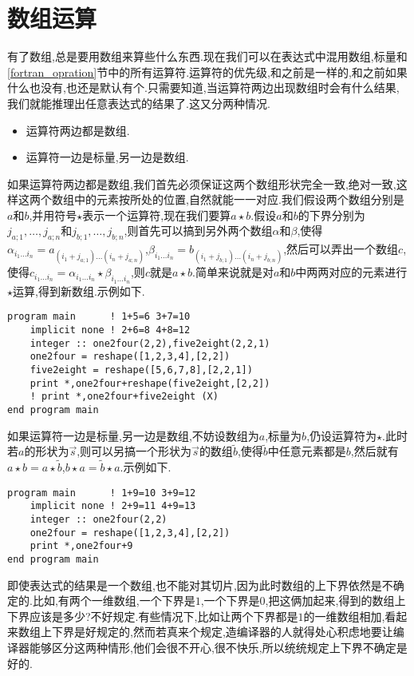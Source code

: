 \section{数组运算}

有了数组,总是要用数组来算些什么东西.现在我们可以在表达式中混用数组,标量和\ref{fortran_opration}节中的所有运算符.运算符的优先级,和之前是一样的,\ttt{+}和\ttt{-}之前如果什么也没有,也还是默认有个.只需要知道,当运算符两边出现数组时会有什么结果,我们就能推理出任意表达式的结果了.这又分两种情况.
\begin{itemize}
\item 运算符两边都是数组.
\item 运算符一边是标量,另一边是数组.
\end{itemize}

如果运算符两边都是数组,我们首先必须保证这两个数组形状完全一致,绝对一致,这样这两个数组中的元素按所处的位置,自然就能一一对应.我们假设两个数组分别是$a$和$b$,并用符号$\star$表示一个运算符,现在我们要算$a\star b$.假设$a$和$b$的下界分别为$j_{a;1},\dots,j_{a;n}$和$j_{b;1},\dots,j_{b;n}$,则首先可以搞到另外两个数组$\alpha$和$\beta$,使得$\alpha_{i_1\dots i_n}=a_{(i_1+j_{a;1})\dots(i_n+j_{a;n})}$,$\beta_{i_1\dots i_n}=b_{(i_1+j_{b;1})\dots(i_n+j_{b;n})}$,然后可以弄出一个数组$c$,使得$c_{i_1\dots i_n}=\alpha_{i_1\dots i_n}\star\beta_{i_1\dots i_n}$,则$c$就是$a\star b$.简单来说就是对$a$和$b$中两两对应的元素进行$\star$运算,得到新数组.示例如下.
\begin{lstlisting}
program main      ! 1+5=6 3+7=10
    implicit none ! 2+6=8 4+8=12
    integer :: one2four(2,2),five2eight(2,2,1)
    one2four = reshape([1,2,3,4],[2,2])
    five2eight = reshape([5,6,7,8],[2,2,1])
    print *,one2four+reshape(five2eight,[2,2])
    ! print *,one2four+five2eight (X)
end program main
\end{lstlisting}

如果运算符一边是标量,另一边是数组,不妨设数组为$a$,标量为$b$,仍设运算符为$\star$.此时若$a$的形状为$\vec{s}$,则可以另搞一个形状为$\vec{s}$的数组$\tilde{b}$,使得$\tilde{b}$中任意元素都是$b$,然后就有$a\star b=a\star\tilde{b}$,$b\star a=\tilde{b}\star a$.示例如下.
\begin{lstlisting}
program main      ! 1+9=10 3+9=12
    implicit none ! 2+9=11 4+9=13
    integer :: one2four(2,2)
    one2four = reshape([1,2,3,4],[2,2])
    print *,one2four+9
end program main
\end{lstlisting}

即使表达式的结果是一个数组,也不能对其切片,因为此时数组的上下界依然是不确定的.比如,有两个一维数组,一个下界是$1$,一个下界是$0$,把这俩加起来,得到的数组上下界应该是多少?不好规定.有些情况下,比如让两个下界都是$1$的一维数组相加,看起来数组上下界是好规定的,然而若真来个规定,造编译器的人就得处心积虑地要让编译器能够区分这两种情形,他们会很不开心,很不快乐,所以统统规定上下界不确定是好的.

